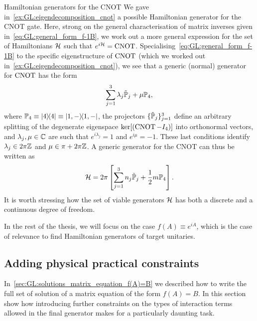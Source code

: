 \begin{examplebox}[label={ex:GL:cnot_generator_decomposition}]{Hamiltonian generators for the CNOT}
We gave in~\cref{ex:GL:eigendecomposition_cnot} a possible Hamiltonian generator for the CNOT gate.
Here, strong on the general characterisation of matrix inverses given in~\cref{eq:GL:general_form_f-1B}, we work out a more general expression for the set of Hamiltonians ${\mathcal{H}}$ such that $e^{i{\mathcal{H}}}=\operatorname{CNOT}$.
Specialising~\cref{eq:GL:general_form_f-1B} to the specific eigenstructure of $\operatorname{CNOT}$ (which we worked out in~\cref{ex:GL:eigendecomposition_cnot}), we see that a generic (normal) generator for $\operatorname{CNOT}$ has the form
\begin{equation}
    \sum_{j=1}^3 \lambda_j \tilde{\mathbb{P}}_j + \mu\mathbb{P}_4,
\end{equation}
where
$\mathbb{P}_4\equiv\ketbra 4\equiv\ketbra{1,-}$, the projectors 
$\{\tilde{\mathbb{P}}_j\}_{j=1}^3$ define an arbitrary splitting of the degenerate eigenspace $\ker[(\operatorname{CNOT}-I_4)]$ into orthonormal vectors, and $\lambda_j,\mu\in\mathbb{C}$ are such that $e^{i\lambda_j}=1$ and $e^{i\mu}=-1$.
These last conditions identify $\lambda_j\in2\pi\mathbb{Z}$ and $\mu\in\pi + 2\pi\mathbb{Z}$.
A generic generator for the CNOT can thus be written as
\begin{equation}
    {\mathcal{H}} =
    2\pi\left[
    \sum_{j=1}^3 n_j \tilde{\mathbb{P}}_j +
    \frac{1}{2} m\mathbb{P}_4
    \right].
\end{equation}
It is worth stressing how the set of viable generators ${\mathcal{H}}$ has both a discrete and a continuous degree of freedom.
\end{examplebox}

In the rest of the thesis, we will focus on the case $f(A)\equiv e^{iA}$, which is the case of relevance to find Hamiltonian generators of target unitaries.

\subsection{Adding physical practical constraints}
\label{sec:GL:constraints_on_interaction_pars}

In~\cref{sec:GL:solutions_matrix_equation_f(A)=B} we described how to write the full set of solution of a matrix equation of the form $f(A)=B$.
In this section show how introducing further constraints on the types of interaction terms allowed in the final generator makes for a particularly daunting task.

